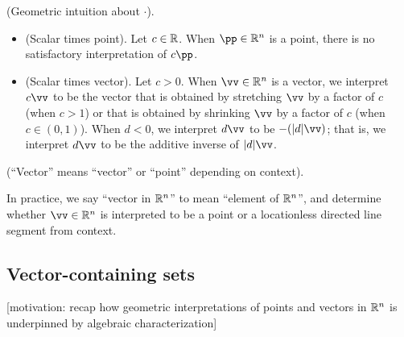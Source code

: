 \begin{remark}
    (Geometric intuition about $\cdot$).
    \begin{itemize}
        \item (Scalar times point). Let $c \in \mathbb{R}$. When $\pp \in \R^n$ is a point, there is no satisfactory interpretation of $c \pp$.
        \item (Scalar times vector). Let $c > 0$. When $\vv \in \R^n$ is a vector, we interpret $c \vv$ to be the vector that is obtained by stretching $\vv$ by a factor of $c$ (when $c > 1$) or that is obtained by shrinking $\vv$ by a factor of $c$ (when $c \in (0, 1)$). When $d < 0$, we interpret $d\vv$ to be $-(|d|\vv)$; that is, we interpret $d\vv$ to be the additive inverse of $|d|\vv$.
    \end{itemize}
\end{remark}

\begin{defn}
    (``Vector'' means ``vector'' or ``point'' depending on context).
    
    In practice, we say ``vector in $\mathbb{R}^n$'' to mean ``element of $\mathbb{R}^n$'', and determine whether $\vv \in \R^n$ is interpreted to be a point or a locationless directed line segment from context.
\end{defn}

\newpage

\subsection*{Vector-containing sets}

[motivation: recap how geometric interpretations of points and vectors in $\mathbb{R}^n$ is underpinned by algebraic characterization]


